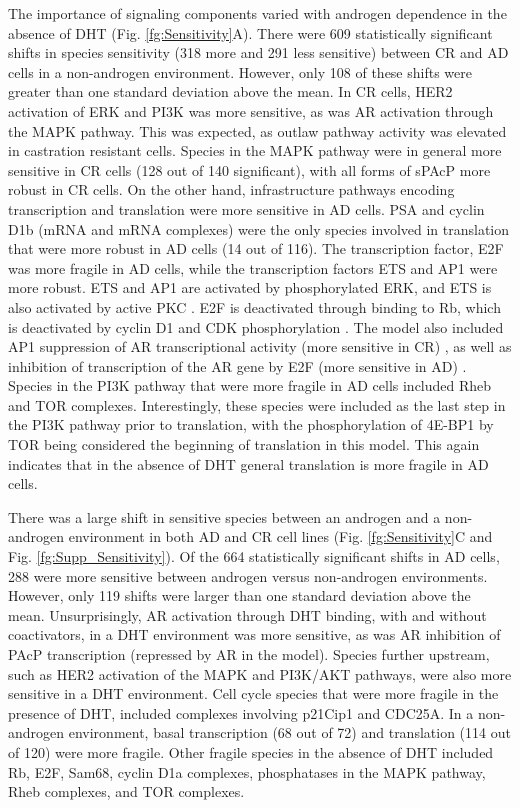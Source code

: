 \documentclass[12pt]{article}
\begin{document}
The importance of signaling components varied with androgen dependence in the absence of DHT (Fig. \ref{fg:Sensitivity}A). 
There were 609 statistically significant shifts in species sensitivity (318 more and 291 less sensitive) between CR and AD cells in a non-androgen environment. 
However, only 108 of these shifts were greater than one standard deviation above the mean. 
In CR cells, HER2 activation of ERK and PI3K was more sensitive, as was AR activation through the MAPK pathway. 
This was expected, as outlaw pathway activity was elevated in castration resistant cells. 
Species in the MAPK pathway were in general more sensitive in CR cells (128 out of 140 significant), with all forms of sPAcP more robust in CR cells.
On the other hand, infrastructure pathways encoding transcription and translation were more sensitive in AD cells.
PSA  and cyclin D1b (mRNA and mRNA complexes) were the only species involved in translation that were more robust in AD cells (14 out of 116).
The transcription factor, E2F was more fragile in AD cells, while the transcription factors ETS and AP1 were more robust. 
ETS and AP1 are activated by phosphorylated ERK, and ETS is also activated by active PKC \cite{Wilkinson2000,Lindemann2003}. 
E2F is deactivated through binding to Rb, which is deactivated by cyclin D1 and CDK phosphorylation \cite{Lapenna2009}. 
The model also included AP1 suppression of AR transcriptional activity (more sensitive in CR) \cite{Sato1997}, as well as inhibition of transcription of the AR gene by E2F (more sensitive in AD) \cite{Davis2006}.
Species in the PI3K pathway that were more fragile in AD cells included Rheb and TOR complexes. 
Interestingly, these species were included as the last step in the PI3K pathway prior to translation, with the phosphorylation of 4E-BP1 by TOR being considered the beginning of translation in this model. 
This again indicates that in the absence of DHT general translation is more fragile in AD cells. 

There was a large shift in sensitive species between an androgen and a non-androgen environment in both AD and CR cell lines (Fig. \ref{fg:Sensitivity}C and Fig. \ref{fg:Supp_Sensitivity}). 
Of the 664 statistically significant shifts in AD cells, 288 were more sensitive between androgen versus non-androgen environments. 
However, only 119 shifts were larger than one standard deviation above the mean. 
Unsurprisingly, AR activation through DHT binding, with and without coactivators, in a DHT environment was more sensitive, as was AR inhibition of PAcP transcription (repressed by AR in the model). 
Species further upstream, such as HER2 activation of the MAPK and PI3K/AKT pathways, were also more sensitive in a DHT environment. 
Cell cycle species that were more fragile in the presence of DHT, included complexes involving p21Cip1 and CDC25A.
In a non-androgen environment, basal transcription (68 out of 72) and translation (114 out of 120) were more fragile. 
Other fragile species in the absence of DHT included Rb, E2F, Sam68, cyclin D1a complexes, phosphatases in the MAPK pathway, Rheb complexes, and TOR complexes. 
\end{document}
